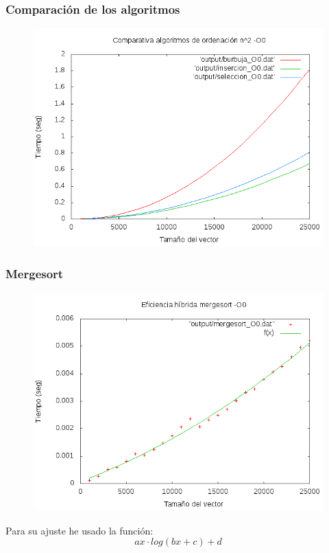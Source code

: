 \documentclass[spanish]{beamer}
\begin{document}
\begin{frame}\frametitle{Comparación de los algoritmos}
  \begin{figure}[H]
    \centering   
        \includegraphics[clip,width=1\columnwidth]{../../plots/cuadraticos_O0.png}%
    \end{figure}
  \end{frame}

 \begin{frame}\frametitle{Mergesort}
    \begin{figure}[H]
    \centering   
    \includegraphics[clip,width=0.76\columnwidth]{../../plots/mergesort_O0_fit.png}%
    \end{figure}

    Para su ajuste he usado la función: $$ax\cdot log(bx +c)+d$$
       
  \end{frame}
\end{document}
